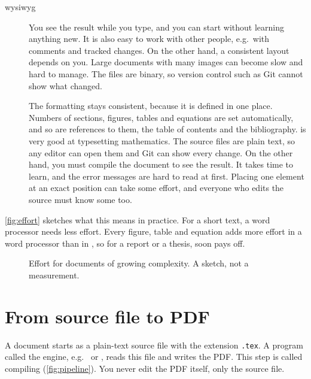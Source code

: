 \begin{description}
    \item[\Gls{wysiwyg}]
        You see the result while you type, and you can start without learning anything new.
        It is also easy to work with other people, e.g.\ with comments and tracked changes.
        On the other hand, a consistent layout depends on you.
        Large documents with many images can become slow and hard to manage.
        The files are binary, so version control such as Git cannot show what changed.
    \item[]
        The formatting stays consistent, because it is defined in one place.
        Numbers of sections, figures, tables and equations are set automatically,
        and so are references to them, the table of contents and the bibliography.
         is very good at typesetting mathematics.
        The source files are plain text, so any editor can open them and Git can show every change.
        On the other hand, you must compile the document to see the result.
        It takes time to learn, and the error messages are hard to read at first.
        Placing one element at an exact position can take some effort,
        and everyone who edits the source must know some  too.
\end{description}

\autoref{fig:effort} sketches what this means in practice.
For a short text, a word processor needs less effort.
Every figure, table and equation adds more effort in a word processor than in ,
so for a report or a thesis,  soon pays off.

\begin{figure}[htbp]
    \centering
    
    \caption{Effort for documents of growing complexity. A sketch, not a measurement.}
    \label{fig:effort}
\end{figure}

\section{From source file to PDF}\label{sec:source-to-pdf}

A  document starts as a plain-text source file with the extension \texttt{.tex}.
A program called the engine, e.g.\  or , reads this file and writes the PDF.
This step is called compiling (\autoref{fig:pipeline}).
You never edit the PDF itself, only the source file.

